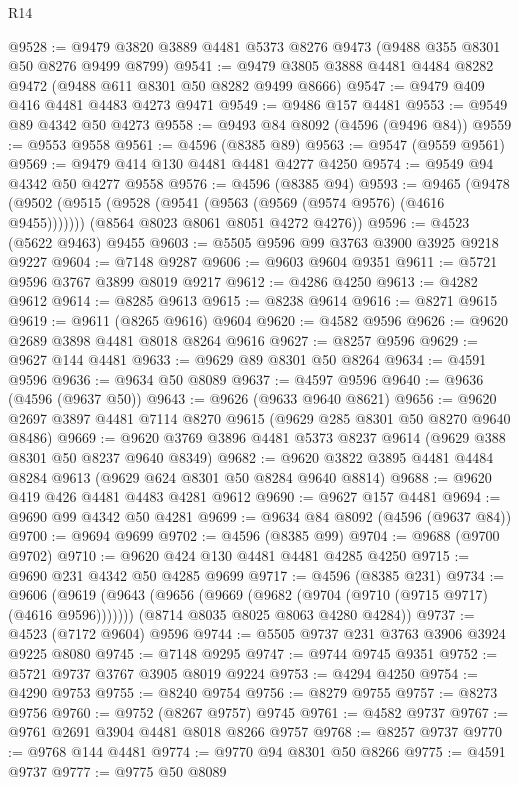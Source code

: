 \begin{lexlean}{R14}
\begin{coremodule}
@9528 := @9479 @3820 @3889 @4481 @5373 @8276 @9473 (@9488 @355 @8301 @50 @8276 @9499 @8799)
@9541 := @9479 @3805 @3888 @4481 @4484 @8282 @9472 (@9488 @611 @8301 @50 @8282 @9499 @8666)
@9547 := @9479 @409 @416 @4481 @4483 @4273 @9471
@9549 := @9486 @157 @4481
@9553 := @9549 @89 @4342 @50 @4273
@9558 := @9493 @84 @8092 (@4596 (@9496 @84))
@9559 := @9553 @9558
@9561 := @4596 (@8385 @89)
@9563 := @9547 (@9559 @9561)
@9569 := @9479 @414 @130 @4481 @4481 @4277 @4250
@9574 := @9549 @94 @4342 @50 @4277 @9558
@9576 := @4596 (@8385 @94)
@9593 := @9465
    (@9478
      (@9502 (@9515 (@9528 (@9541 (@9563 (@9569 (@9574 @9576) (@4616 @9455)))))))
      (@8564 @8023 @8061 @8051 @4272 @4276))
@9596 := @4523 (@5622 @9463) @9455
@9603 := @5505 @9596 @99 @3763 @3900 @3925 @9218 @9227
@9604 := @7148 @9287
@9606 := @9603 @9604 @9351
@9611 := @5721 @9596 @3767 @3899 @8019 @9217
@9612 := @4286 @4250
@9613 := @4282 @9612
@9614 := @8285 @9613
@9615 := @8238 @9614
@9616 := @8271 @9615
@9619 := @9611 (@8265 @9616) @9604
@9620 := @4582 @9596
@9626 := @9620 @2689 @3898 @4481 @8018 @8264 @9616
@9627 := @8257 @9596
@9629 := @9627 @144 @4481
@9633 := @9629 @89 @8301 @50 @8264
@9634 := @4591 @9596
@9636 := @9634 @50 @8089
@9637 := @4597 @9596
@9640 := @9636 (@4596 (@9637 @50))
@9643 := @9626 (@9633 @9640 @8621)
@9656 := @9620 @2697 @3897 @4481 @7114 @8270 @9615 (@9629 @285 @8301 @50 @8270 @9640 @8486)
@9669 := @9620 @3769 @3896 @4481 @5373 @8237 @9614 (@9629 @388 @8301 @50 @8237 @9640 @8349)
@9682 := @9620 @3822 @3895 @4481 @4484 @8284 @9613 (@9629 @624 @8301 @50 @8284 @9640 @8814)
@9688 := @9620 @419 @426 @4481 @4483 @4281 @9612
@9690 := @9627 @157 @4481
@9694 := @9690 @99 @4342 @50 @4281
@9699 := @9634 @84 @8092 (@4596 (@9637 @84))
@9700 := @9694 @9699
@9702 := @4596 (@8385 @99)
@9704 := @9688 (@9700 @9702)
@9710 := @9620 @424 @130 @4481 @4481 @4285 @4250
@9715 := @9690 @231 @4342 @50 @4285 @9699
@9717 := @4596 (@8385 @231)
@9734 := @9606
    (@9619
      (@9643 (@9656 (@9669 (@9682 (@9704 (@9710 (@9715 @9717) (@4616 @9596)))))))
      (@8714 @8035 @8025 @8063 @4280 @4284))
@9737 := @4523 (@7172 @9604) @9596
@9744 := @5505 @9737 @231 @3763 @3906 @3924 @9225 @8080
@9745 := @7148 @9295
@9747 := @9744 @9745 @9351
@9752 := @5721 @9737 @3767 @3905 @8019 @9224
@9753 := @4294 @4250
@9754 := @4290 @9753
@9755 := @8240 @9754
@9756 := @8279 @9755
@9757 := @8273 @9756
@9760 := @9752 (@8267 @9757) @9745
@9761 := @4582 @9737
@9767 := @9761 @2691 @3904 @4481 @8018 @8266 @9757
@9768 := @8257 @9737
@9770 := @9768 @144 @4481
@9774 := @9770 @94 @8301 @50 @8266
@9775 := @4591 @9737
@9777 := @9775 @50 @8089

\end{coremodule}
\end{lexlean}
